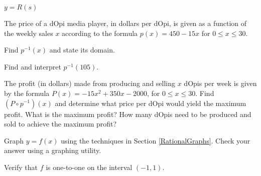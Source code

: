 \documentclass{ximera}
\begin{document}
\begin{question}
$y = R(s)$ 

% 
 

\end{question}

\begin{question}
The price of a dOpi media player, in dollars per dOpi, is given as a function of the weekly sales $x$ according to the formula $p(x) = 450-15x$ for $0 \leq x \leq 30$.

\end{question}

\begin{question}
Find $p^{-1}(x)$ and state its domain.
\end{question}

\begin{question}
Find and interpret $p^{-1}(105)$.
\end{question}

\begin{question}
The profit (in dollars) made from producing and selling $x$ dOpis per week is given by the formula $P(x)= -15x^2+350x-2000$, for $0 \leq x \leq 30$.  Find $\left(P \circ p^{-1}\right)(x)$ and determine what price per dOpi would yield the maximum profit.  What is the maximum profit?  How many dOpis need to be produced and sold to achieve the maximum profit?
\end{question}

\begin{question}
Graph $y = f(x)$ using the techniques  in Section \ref{RationalGraphs}.  Check your answer using a graphing utility.
\end{question}

\begin{question}
Verify that $f$ is one-to-one on the interval $(-1,1)$.
\end{question}
\end{document}
